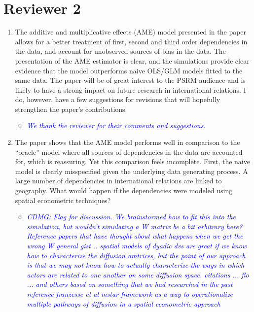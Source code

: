 \section*{Reviewer 2}

\begin{enumerate}
	\item The additive and multiplicative effects (AME) model presented in the paper allows for a better treatment of first, second and third order dependencies in the data, and account for unobserved sources of bias in the data. The presentation of the AME estimator is clear, and the simulations provide clear evidence that the model outperforms naive OLS/GLM models fitted to the same data. The paper will be of great interest to the PSRM audience and is likely to have a strong impact on future research in international relations. I do, however, have a few suggestions for revisions that will hopefully strengthen the paper’s contributions.
	\begin{itemize}
		\item \textcolor{blue}{ \emph{
		We thank the reviewer for their comments and suggestions.
		}}
	\end{itemize}
	\item The paper shows that the AME model performs well in comparison to the “oracle” model where all sources of dependencies in the data are accounted for, which is reassuring. Yet this comparison feels incomplete. First, the naive model is clearly misspecified given the underlying data generating process. A large number of dependencies in international relations are linked to geography. What would happen if the dependencies were modeled using spatial econometric techniques?
	\begin{itemize}
		\item \textcolor{blue}{ \emph{
		CDMG: Flag for discussion. We brainstormed how to fit this into the simulation, but wouldn't simulating a W matrix be a bit arbitrary here?
		Reference papers that have thought about what happens when we get the wrong W
		general gist .. spatial models of dyadic dvs are great if we know how to characterize the diffusion amtrices, but the point of our approach is that we may not know how to actually characterize the ways in which actors are related to one another on some diffusion space.
		citations ... flo ... and others based on something that we had researched in the past
		reference franzesse et al mstar framework as a way to operationalize multiple pathways of diffusion in a spatial econometric approach
		}}
	\end{itemize}

\end{enumerate}
